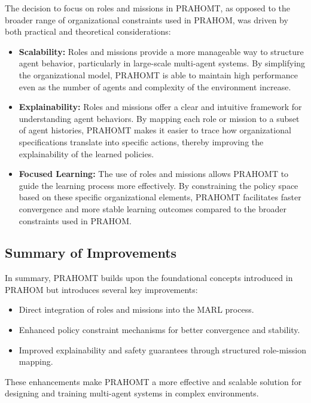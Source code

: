 \documentclass[sigconf,anonymous]{aamas}
\begin{document}
The decision to focus on roles and missions in PRAHOMT, as opposed to the broader range of organizational constraints used in PRAHOM, was driven by both practical and theoretical considerations:

\begin{itemize}
    \item \textbf{Scalability:} Roles and missions provide a more manageable way to structure agent behavior, particularly in large-scale multi-agent systems. By simplifying the organizational model, PRAHOMT is able to maintain high performance even as the number of agents and complexity of the environment increase.
    
    \item \textbf{Explainability:} Roles and missions offer a clear and intuitive framework for understanding agent behaviors. By mapping each role or mission to a subset of agent histories, PRAHOMT makes it easier to trace how organizational specifications translate into specific actions, thereby improving the explainability of the learned policies.
    
    \item \textbf{Focused Learning:} The use of roles and missions allows PRAHOMT to guide the learning process more effectively. By constraining the policy space based on these specific organizational elements, PRAHOMT facilitates faster convergence and more stable learning outcomes compared to the broader constraints used in PRAHOM.
\end{itemize}

\subsection{Summary of Improvements}

In summary, PRAHOMT builds upon the foundational concepts introduced in PRAHOM but introduces several key improvements:
\begin{itemize}
    \item Direct integration of roles and missions into the MARL process.
    \item Enhanced policy constraint mechanisms for better convergence and stability.
    \item Improved explainability and safety guarantees through structured role-mission mapping.
\end{itemize}
These enhancements make PRAHOMT a more effective and scalable solution for designing and training multi-agent systems in complex environments.
\end{document}
